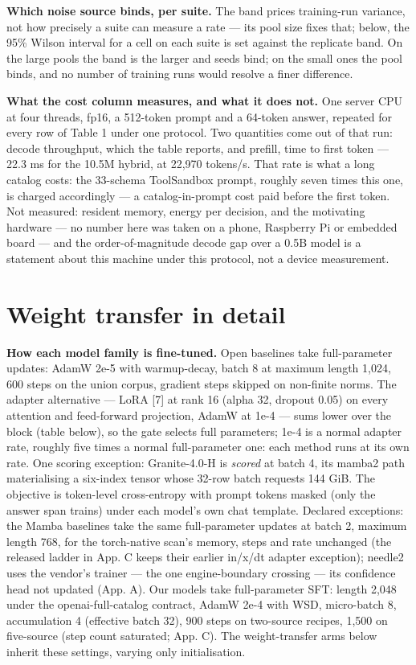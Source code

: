 \documentclass{article}
\begin{document}
\textbf{Which noise source binds, per suite.} The band prices training-run variance, not
how precisely a suite can measure a rate --- its pool size fixes that; below, the
95\% Wilson interval for a cell on each suite is set against the replicate band. On the large
pools the band is the
larger and seeds bind; on the small ones the pool binds, and no number of training runs would
resolve a finer difference.

\textbf{What the cost column measures, and what it does not.} One server CPU at four threads, fp16, a 512-token prompt and a 64-token answer, repeated for every row of Table 1 under one protocol. Two quantities come out of that run: decode throughput, which the table reports, and prefill, time to first token --- 22.3 ms for the 10.5M hybrid, at 22,970 tokens/s. That rate is what a long catalog costs: the 33-schema ToolSandbox prompt, roughly seven times this one, is charged accordingly --- a catalog-in-prompt cost paid before the first token. Not measured: resident memory, energy per decision, and the motivating hardware --- no number here was taken on a phone, Raspberry Pi or embedded board --- and the order-of-magnitude decode gap over a 0.5B model is a statement about this machine under this protocol, not a device measurement.
\section{Weight transfer in detail}

\textbf{How each model family is fine-tuned.} Open baselines take full-parameter updates: AdamW 2e-5 with warmup-decay, batch 8 at maximum length 1,024, 600 steps on the union corpus, gradient steps skipped on non-finite norms. The adapter alternative --- LoRA [7] at rank 16 (alpha 32, dropout 0.05) on every attention and feed-forward projection, AdamW at 1e-4 --- sums lower over the block (table below), so the gate selects full parameters; 1e-4 is a normal adapter rate, roughly five times a normal full-parameter one: each method runs at its own rate. One scoring exception: Granite-4.0-H is \emph{scored} at batch 4, its mamba2 path materialising a six-index tensor whose 32-row batch requests 144 GiB. The objective is token-level cross-entropy with prompt tokens masked (only the answer span trains) under each model's own chat template. Declared exceptions: the Mamba baselines take the same full-parameter updates at batch 2, maximum
length 768, for the torch-native scan's memory, steps and rate unchanged (the released
ladder in App. C keeps their earlier in/x/dt adapter exception); needle2
uses the vendor's trainer --- the one engine-boundary crossing --- its confidence head not updated (App. A). Our models take full-parameter SFT: length 2,048 under the openai-full-catalog contract, AdamW 2e-4 with WSD, micro-batch 8, accumulation 4 (effective batch 32), 900 steps on two-source recipes, 1,500 on five-source (step count saturated; App. C). The
weight-transfer arms below inherit these settings, varying only initialisation.
\end{document}
